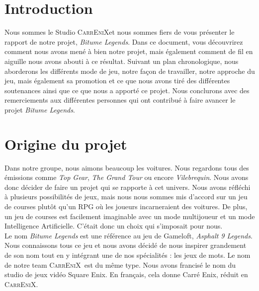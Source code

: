 \documentclass[a4paper,12pt]{article}
\newcommand{\btmlgs}{\textsl{Bitume Legends}}
\newcommand{\AI}{Intelligence Artificielle}
\newcommand{\CEX}{\textsc{CarrEniX}}
\begin{document}
  

    

    \newpage

    \tableofcontents

    \newpage

    \section*{Introduction}
    Nous sommes le Studio \CEX\;et nous sommes fiers de vous présenter le rapport de notre projet, \btmlgs. 
    Dans ce document, vous découvrirez comment nous avons mené à bien notre projet, mais également comment de fil en aiguille nous avons abouti à ce résultat. Suivant un plan chronologique, nous aborderons les différents mode de jeu, notre façon de travailler, notre approche du jeu, mais également sa promotion et ce que nous avons tiré des différentes soutenances ainsi que ce que nous a apporté ce projet. Nous conclurons avec des remerciements aux différentes personnes qui ont contribué à faire avancer le projet \btmlgs.


    \section{Origine du projet}
        Dans notre groupe, nous aimons beaucoup les voitures. Nous regardons tous des émissions comme 
        \textit{Top Gear}, \textit{The Grand Tour} ou encore \textit{Vilebrequin}. Nous avons donc décider de faire
        un projet qui se rapporte à cet univers. Nous avons réfléchi à plusieurs possibilités de jeux, mais nous
        nous sommes mis d'accord sur un jeu de courses plutôt qu'un RPG où les joueurs incarneraient des voitures.
        De plus, un jeu de courses est facilement imaginable avec un mode multijoueur et un mode \AI. C'était donc un choix qui s'imposait pour nous.\\

        Le nom \textit{Bitume Legends} est une référence au jeu de Gameloft, \textit{Asphalt 9 Legends}.
        Nous connaissons tous ce jeu et nous avons décidé de nous inspirer grandement de son nom tout en y intégrant
        une de nos spécialités : les jeux de mots. Le nom de notre team \CEX\, est du même type. Nous avons 
        francisé le nom du studio de jeux vidéo Square Enix. En français, cela donne Carré Enix, réduit en
        \CEX.\\
    
\end{document}
